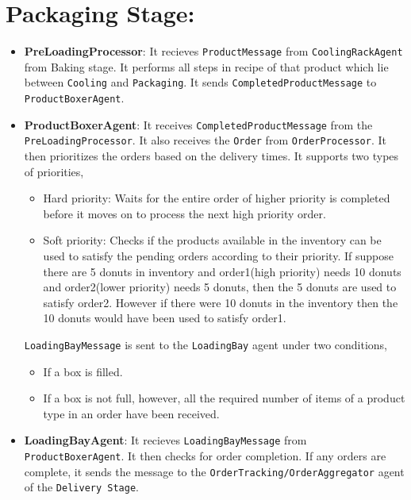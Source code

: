 \documentclass[12pt]{article}
\begin{document}
\section{Packaging Stage:}
\begin{itemize}
    \item \textbf{PreLoadingProcessor}:
 It recieves \texttt{ProductMessage} from \texttt{CoolingRackAgent} from Baking stage.
 It performs all steps in recipe of that product which lie between \texttt{Cooling} and \texttt{Packaging}.
 It sends \texttt{CompletedProductMessage} to \texttt{ProductBoxerAgent}.
	\item \textbf{ProductBoxerAgent}: It receives \texttt{CompletedProductMessage} from the \texttt{PreLoadingProcessor}. It also receives the \texttt{Order} from \texttt{OrderProcessor}. It then prioritizes the orders based on the delivery times. It supports two types of priorities,
\begin{itemize}
\item Hard priority: Waits for the entire order of higher priority is completed before it moves on to process the next high priority order.
\item Soft priority: Checks if the products available in the inventory can be used to satisfy the pending orders according to their priority. If suppose there are 5 donuts in inventory and order1(high priority) needs 10 donuts and order2(lower priority) needs 5 donuts, then the 5 donuts are used to satisfy order2. However if there were 10 donuts in the inventory then the 10 donuts would have been used to satisfy order1.\
\end{itemize}
\texttt{LoadingBayMessage} is sent to the \texttt{LoadingBay} agent under two conditions,
\begin{itemize}
\item If a box is filled.
\item If a box is not full, however, all the required number of items of a product type in an order have been received.
\end{itemize}
    \item \textbf{LoadingBayAgent}:
 It recieves \texttt{LoadingBayMessage} from \\ \texttt{ProductBoxerAgent}.
 It then checks for order completion. If any orders are complete, it sends the  message to the \texttt{OrderTracking/OrderAggregator} agent of the \texttt{Delivery Stage}.   
\end{itemize}
\end{document}
